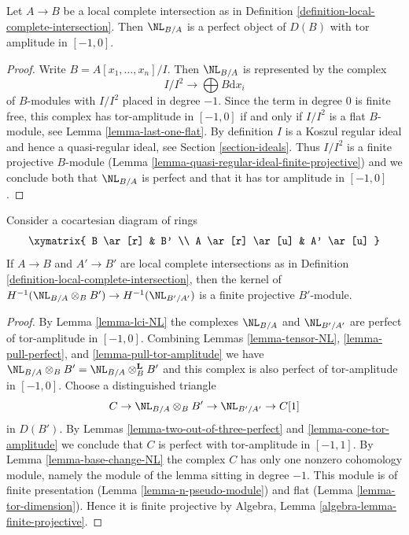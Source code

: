 \begin{lemma}
\label{lemma-lci-NL}
Let $A \to B$ be a local complete intersection as in
Definition \ref{definition-local-complete-intersection}.
Then $\NL_{B/A}$ is a perfect object of
$D(B)$ with tor amplitude in $[-1, 0]$.
\end{lemma}

\begin{proof}
Write $B = A[x_1, \ldots, x_n]/I$. Then $\NL_{B/A}$ is represented by
the complex
$$
I/I^2 \longrightarrow \bigoplus B \text{d}x_i
$$
of $B$-modules with $I/I^2$ placed in degree $-1$. Since the term in
degree $0$ is finite free, this complex has tor-amplitude in $[-1, 0]$ if and
only if $I/I^2$ is a flat $B$-module, see
Lemma \ref{lemma-last-one-flat}. By definition $I$ is a Koszul regular
ideal and hence a quasi-regular ideal, see Section \ref{section-ideals}.
Thus $I/I^2$ is a finite projective $B$-module
(Lemma \ref{lemma-quasi-regular-ideal-finite-projective})
and we conclude both that $\NL_{B/A}$ is perfect and that it has tor amplitude
in $[-1, 0]$.
\end{proof}

\begin{lemma}
\label{lemma-base-change-lci-bis}
Consider a cocartesian diagram of rings
$$
\xymatrix{
B \ar[r] & B' \\
A \ar[r] \ar[u] & A' \ar[u]
}
$$
If $A \to B$ and $A' \to B'$ are local complete intersections as in
Definition \ref{definition-local-complete-intersection}, then
the kernel of $H^{-1}(\NL_{B/A} \otimes_B B') \to H^{-1}(\NL_{B'/A'})$
is a finite projective $B'$-module.
\end{lemma}

\begin{proof}
By Lemma \ref{lemma-lci-NL} the complexes $\NL_{B/A}$ and $\NL_{B'/A'}$
are perfect of tor-amplitude in $[-1, 0]$.
Combining Lemmas \ref{lemma-tensor-NL}, \ref{lemma-pull-perfect}, and
\ref{lemma-pull-tor-amplitude} we have
$\NL_{B/A} \otimes_B B' = \NL_{B/A} \otimes_B^\mathbf{L} B'$
and this complex is also perfect of tor-amplitude in $[-1, 0]$.
Choose a distinguished triangle
$$
C \to \NL_{B/A} \otimes_B B'  \to \NL_{B'/A'} \to C[1]
$$
in $D(B')$. By Lemmas \ref{lemma-two-out-of-three-perfect} and
\ref{lemma-cone-tor-amplitude} we conclude that $C$ is perfect
with tor-amplitude in $[-1, 1]$. By Lemma \ref{lemma-base-change-NL}
the complex $C$ has only one nonzero cohomology module, namely the module
of the lemma sitting in degree $-1$. This module is of finite presentation
(Lemma \ref{lemma-n-pseudo-module}) and flat
(Lemma \ref{lemma-tor-dimension}). Hence it is finite projective by
Algebra, Lemma \ref{algebra-lemma-finite-projective}.
\end{proof}












